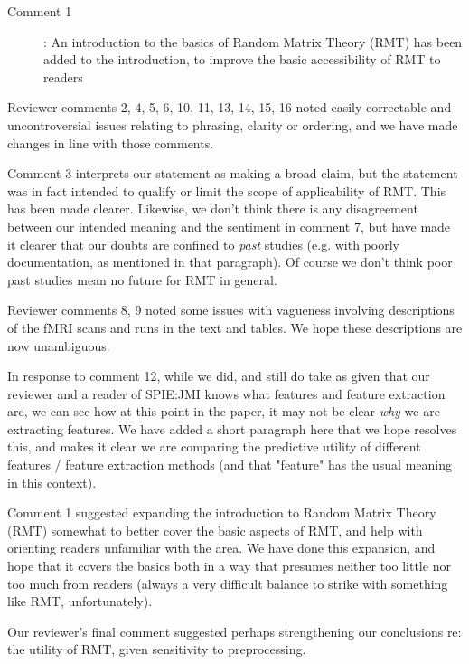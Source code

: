 \documentclass[10pt,letter]{article}
\begin{document}
\begin{description}
\item[Comment 1]: An introduction to the basics of Random Matrix Theory (RMT) has been
added to the introduction, to improve the basic accessibility of RMT to readers
\end{description}


Reviewer comments 2, 4, 5, 6, 10, 11, 13, 14, 15, 16 noted easily-correctable
and uncontroversial issues relating to phrasing, clarity or ordering, and we
have made changes in line with those comments.

Comment 3 interprets our statement as making a broad claim, but the statement was
in fact intended to qualify or limit the scope of applicability of RMT. This has been
made clearer. Likewise, we don't think there is any disagreement between our
intended meaning and the sentiment in comment 7, but have made it clearer that
our doubts are confined to \textit{past} studies (e.g. with poorly documentation,
as mentioned in that paragraph). Of course we don't think poor past studies mean no
future for RMT in general.


Reviewer comments 8, 9 noted some issues with vagueness involving descriptions
of the fMRI scans and runs in the text and tables. We hope these descriptions are now
unambiguous.

In response to comment 12, while we did, and still do take as given that our
reviewer and a reader of SPIE:JMI knows what features and feature extraction
are, we can see how at this point in the paper, it may not be clear
\textit{why} we are extracting features. We have added a short paragraph here
that we hope resolves this, and makes it clear we are comparing the predictive
utility of different features / feature extraction methods (and that "feature"
has the usual meaning in this context).



Comment 1 suggested expanding the introduction to Random Matrix Theory (RMT)
somewhat to better cover the basic aspects of RMT, and help with orienting
readers unfamiliar with the area. We have done this expansion, and hope that it
covers the basics both in a way that presumes neither too little nor too much
from readers (always a very difficult balance to strike with something like
RMT, unfortunately).

Our reviewer's final comment suggested perhaps strengthening our conclusions
re: the utility of RMT, given sensitivity to preprocessing.
\end{document}
